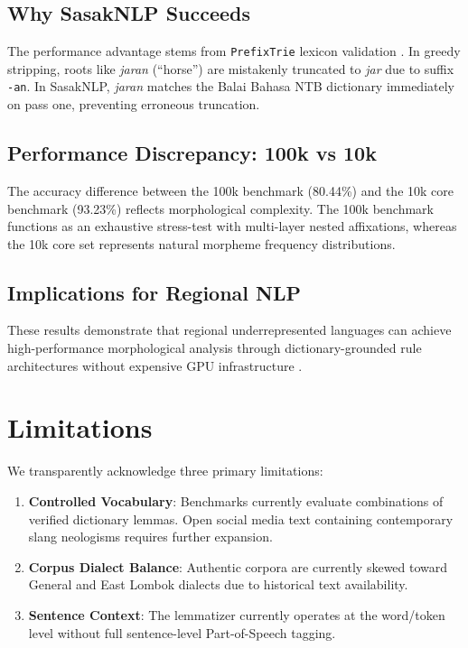 \documentclass[journal,10pt]{IEEEtran}
\begin{document}
\subsection{Why SasakNLP Succeeds}
The performance advantage stems from \texttt{PrefixTrie} lexicon validation \cite{balaibahasa2022, jurafsky2024}. In greedy stripping, roots like \textit{jaran} (``horse'') are mistakenly truncated to \textit{jar} due to suffix \texttt{-an}. In SasakNLP, \textit{jaran} matches the Balai Bahasa NTB dictionary immediately on pass one, preventing erroneous truncation.

\subsection{Performance Discrepancy: 100k vs 10k}
The accuracy difference between the 100k benchmark (80.44\%) and the 10k core benchmark (93.23\%) reflects morphological complexity. The 100k benchmark functions as an exhaustive stress-test with multi-layer nested affixations, whereas the 10k core set represents natural morpheme frequency distributions.

\subsection{Implications for Regional NLP}
These results demonstrate that regional underrepresented languages can achieve high-performance morphological analysis through dictionary-grounded rule architectures without expensive GPU infrastructure \cite{aji2022, winata2023, abidin2024}.

\section{Limitations}
We transparently acknowledge three primary limitations:
\begin{enumerate}
    \item \textbf{Controlled Vocabulary}: Benchmarks currently evaluate combinations of verified dictionary lemmas. Open social media text containing contemporary slang neologisms requires further expansion.
    \item \textbf{Corpus Dialect Balance}: Authentic corpora are currently skewed toward General and East Lombok dialects due to historical text availability.
    \item \textbf{Sentence Context}: The lemmatizer currently operates at the word/token level without full sentence-level Part-of-Speech tagging.
\end{enumerate}
\end{document}
